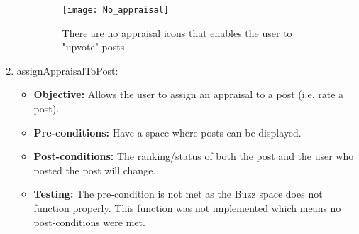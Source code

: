\begin{enumerate}
\begin{itemize}
\begin{figure}[h!]
  \centering
    \texttt{[image: No\_appraisal]}
    \caption{There are no appraisal icons that enables the user to "upvote" posts}
\end{figure}	
	\end{itemize}
\item assignAppraisalToPost:
	\begin{itemize}
		\item\textbf{Objective: } Allows the user to assign an appraisal to a post (i.e. rate a post).
		\item\textbf{Pre-conditions: }  Have a space where posts can be displayed.
		\item\textbf{Post-conditions: }The ranking/status of both the post and the user who posted the post will change.
		\item\textbf{Testing: } The pre-condition is not met as  the Buzz space does not function properly. This function was not implemented which means no post-conditions were met.
	\end{itemize}
\end{enumerate}